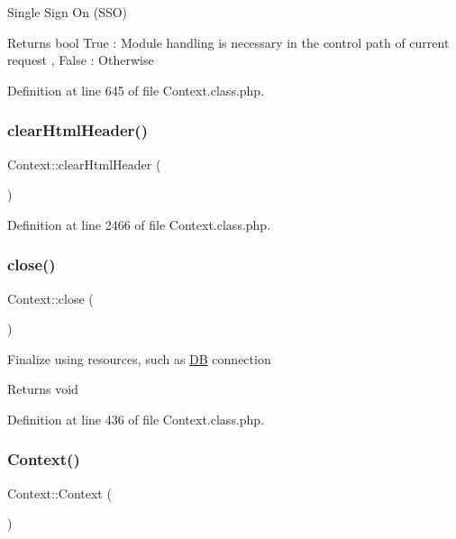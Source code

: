 Single Sign On (S\+SO)

\begin{DoxyReturn}{Returns}
bool True \+: Module handling is necessary in the control path of current request , False \+: Otherwise 
\end{DoxyReturn}


Definition at line 645 of file Context.\+class.\+php.

\hypertarget{classContext_a5f0332b30b4ad65c0374ebd848c1dd98}{}\label{classContext_a5f0332b30b4ad65c0374ebd848c1dd98} 
\subsubsection{\texorpdfstring{clear\+Html\+Header()}{clearHtmlHeader()}}
{\footnotesize\ttfamily Context\+::clear\+Html\+Header (\begin{DoxyParamCaption}{ }\end{DoxyParamCaption})}



Definition at line 2466 of file Context.\+class.\+php.

\hypertarget{classContext_ad59031e45d21ad27eb7d06e0ee76f008}{}\label{classContext_ad59031e45d21ad27eb7d06e0ee76f008} 
\subsubsection{\texorpdfstring{close()}{close()}}
{\footnotesize\ttfamily Context\+::close (\begin{DoxyParamCaption}{ }\end{DoxyParamCaption})}

Finalize using resources, such as \hyperlink{classDB}{DB} connection

\begin{DoxyReturn}{Returns}
void 
\end{DoxyReturn}


Definition at line 436 of file Context.\+class.\+php.

\hypertarget{classContext_a652cdcd2eedc8dbd9110bd284c5d5cf0}{}\label{classContext_a652cdcd2eedc8dbd9110bd284c5d5cf0} 
\subsubsection{\texorpdfstring{Context()}{Context()}}
{\footnotesize\ttfamily Context\+::\+Context (\begin{DoxyParamCaption}{ }\end{DoxyParamCaption})}

